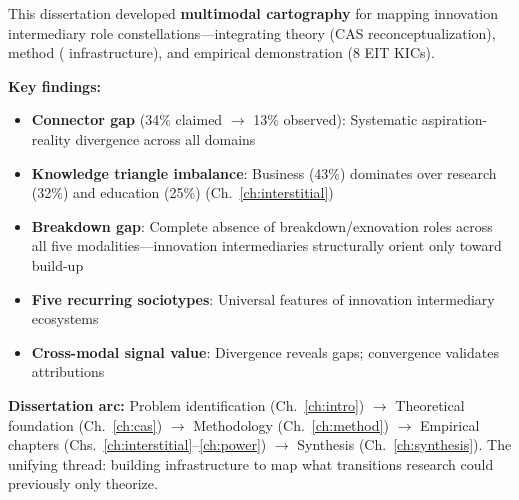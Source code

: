 \documentclass[../main.tex]{subfiles}
\begin{document}
\begin{summarybox}
This dissertation developed \textbf{multimodal cartography} for mapping innovation intermediary role constellations---integrating theory (CAS reconceptualization), method (\RoleBox{} infrastructure), and empirical demonstration (8 EIT KICs).

\vspace{0.5em}
\textbf{Key findings:}
\begin{itemize}[leftmargin=*, itemsep=0.2em]
\item \textbf{Connector gap} (34\% claimed $\rightarrow$ 13\% observed): Systematic aspiration-reality divergence across all domains
\item \textbf{Knowledge triangle imbalance}: Business (43\%) dominates over research (32\%) and education (25\%) (Ch.~\ref{ch:interstitial})
\item \textbf{Breakdown gap}: Complete absence of breakdown/exnovation roles across all five modalities---innovation intermediaries structurally orient only toward build-up
\item \textbf{Five recurring sociotypes}: Universal features of innovation intermediary ecosystems
\item \textbf{Cross-modal signal value}: Divergence reveals gaps; convergence validates attributions
\end{itemize}

\vspace{0.5em}
\textbf{Dissertation arc:} Problem identification (Ch.~\ref{ch:intro}) $\rightarrow$ Theoretical foundation (Ch.~\ref{ch:cas}) $\rightarrow$ Methodology (Ch.~\ref{ch:method}) $\rightarrow$ Empirical chapters (Chs.~\ref{ch:interstitial}--\ref{ch:power}) $\rightarrow$ Synthesis (Ch.~\ref{ch:synthesis}). The unifying thread: building infrastructure to map what transitions research could previously only theorize.
\end{summarybox}
\end{document}
